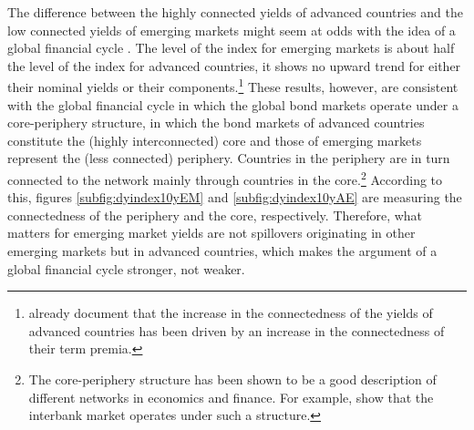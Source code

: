 {The difference between the highly connected yields of advanced countries and the low connected yields of emerging markets might seem at odds with the idea of a 
global financial cycle \citep{Rey:2013}.
The level of the index for emerging markets is about half the level of the index for advanced countries, it shows no upward trend for either their nominal yields or their components.\footnote{ \cite{ACDM:2019} already document that the increase in the connectedness of the yields of advanced countries has been driven by an increase in the connectedness of their term premia.}
These results, however, are consistent with the global financial cycle in which the global bond markets operate under a core-periphery structure, in which the bond markets of advanced countries constitute the (highly interconnected) core and those of emerging markets represent the (less connected) periphery.
Countries in the periphery are in turn connected to the network mainly through countries in the core.\footnote{ The core-periphery structure has been shown to be a good description of different networks in economics and finance. For example, \cite{CvP:2014} show that the interbank market operates under such a structure.}
According to this, figures \ref{subfig:dyindex10yEM} and \ref{subfig:dyindex10yAE} are measuring the connectedness of the periphery and the core, respectively.
Therefore, what matters for emerging market yields are not spillovers originating in other emerging markets but in advanced countries, which makes the argument of a global financial cycle stronger, not weaker.

}
